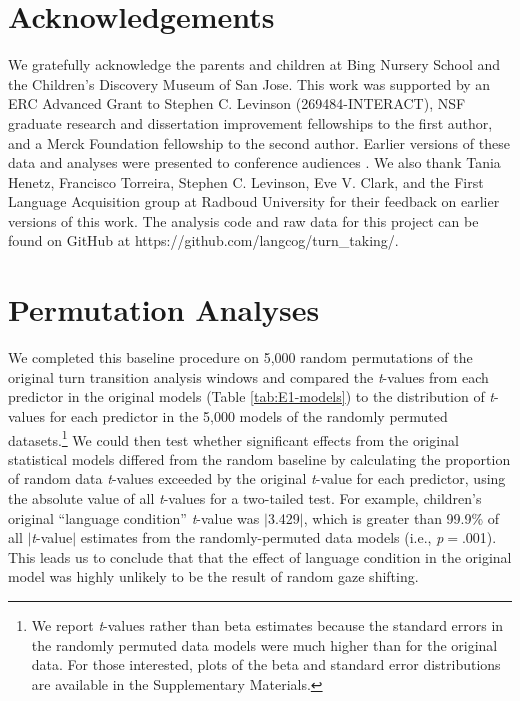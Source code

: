\documentclass[authoryear, 12pt]{elsarticle}
\begin{document}
\section*{Acknowledgements}

We gratefully acknowledge the parents and children at Bing Nursery School and the Children's Discovery Museum of San Jose. This work was supported by an ERC Advanced Grant to Stephen C. Levinson (269484-INTERACT), NSF graduate research and dissertation improvement fellowships to the first author, and a Merck Foundation fellowship to the second author. Earlier versions of these data and analyses were presented to conference audiences \citep{casillas2012, casillas2013}. We also thank Tania Henetz, Francisco Torreira, Stephen C. Levinson, Eve V. Clark, and the First Language Acquisition group at Radboud University for their feedback on earlier versions of this work. The analysis code and raw data for this project can be found on GitHub at https://github.com/langcog/turn\_taking/.




\appendix

\section{Permutation Analyses}
\setcounter{figure}{0}  

We completed this baseline procedure on 5,000 random permutations of the original turn transition analysis windows and compared the \textit{t}-values from each predictor in the original models (Table \ref{tab:E1-models}) to the distribution of \textit{t}-values for each predictor in the 5,000 models of the randomly permuted datasets.\footnote{We report \textit{t}-values rather than beta estimates because the standard errors in the randomly permuted data models were much higher than for the original data. For those interested, plots of the beta and standard error distributions are available in the Supplementary Materials.} We could then test whether significant effects from the original statistical models differed from the random baseline by calculating the proportion of random data \textit{t}-values exceeded by the original \textit{t}-value for each predictor, using the absolute value of all \textit{t}-values for a two-tailed test. For example, children's original ``language condition'' \textit{t}-value was $|$3.429$|$, which is greater than 99.9\% of all $|$\textit{t}-value$|$ estimates from the randomly-permuted data models (i.e., \textit{p}$=$.001). This leads us to conclude that that the effect of language condition in the original model was highly unlikely to be the result of random gaze shifting. 
\end{document}
